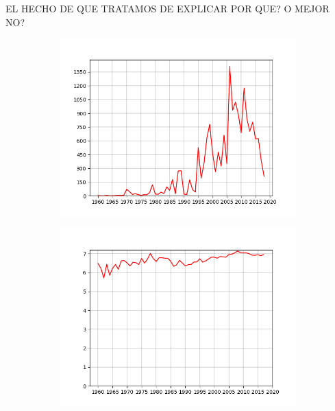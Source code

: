 \begin{frame}
EL HECHO DE QUE TRATAMOS DE EXPLICAR POR QUE? O MEJOR NO?
\begin{figure}
	\centering
	\begin{subfigure}{.4\columnwidth}
		\centering
		\includegraphics[width=\columnwidth]{graphics/avgFavorites.png}
	\end{subfigure}%
	\begin{subfigure}{.4\columnwidth}
		\centering
		\includegraphics[width=\columnwidth]{graphics/avgScores.png}
	\end{subfigure}
	\begin{subfigure}{.4\columnwidth}
		\centering

\end{subfigure}
\end{figure}
\end{frame}
